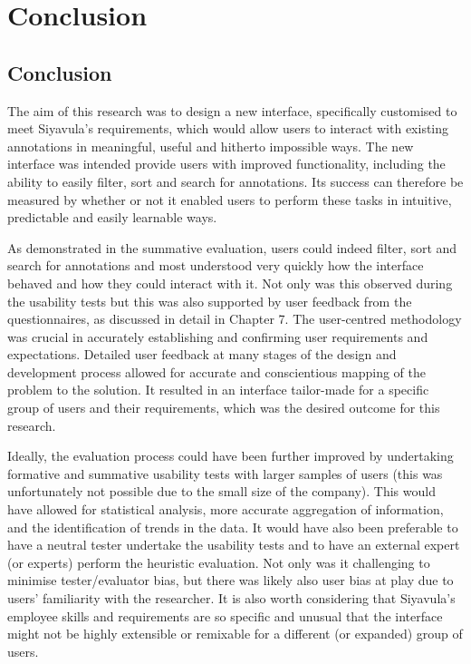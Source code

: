 
\chapter{Conclusion} %

\label{Conclusion} %



\section{Conclusion}

The aim of this research was to design a new interface, specifically customised to meet Siyavula's requirements, which would allow users to interact with existing annotations in meaningful, useful and hitherto impossible ways. The new interface was intended provide users with improved functionality, including the ability to easily filter, sort and search for annotations. Its success can therefore be measured by whether or not it enabled users to perform these tasks in intuitive, predictable and easily learnable ways. 

As demonstrated in the summative evaluation, users could indeed filter, sort and search for annotations and most understood very quickly how the interface behaved and how they could interact with it. Not only was this observed during the usability tests but this was also supported by user feedback from the questionnaires, as discussed in detail in Chapter 7. The user-centred methodology was crucial in accurately establishing and confirming user requirements and expectations. Detailed user feedback at many stages of the design and development process allowed for accurate and conscientious mapping of the problem to the solution. It resulted in an interface tailor-made for a specific group of users and their requirements, which was the desired outcome for this research. 

Ideally, the evaluation process could have been further improved by undertaking formative and summative usability tests with larger samples of users (this was unfortunately not possible due to the small size of the company). This would have allowed for statistical analysis, more accurate aggregation of information, and the identification of trends in the data. It would have also been preferable to have a neutral tester undertake the usability tests and to have an external expert (or experts) perform the heuristic evaluation. Not only was it challenging to minimise tester/evaluator bias, but there was likely also user bias at play due to users' familiarity with the researcher. It is also worth considering that Siyavula's employee skills and requirements are so specific and unusual that the interface might not be highly extensible or remixable for a different (or expanded) group of users. 

